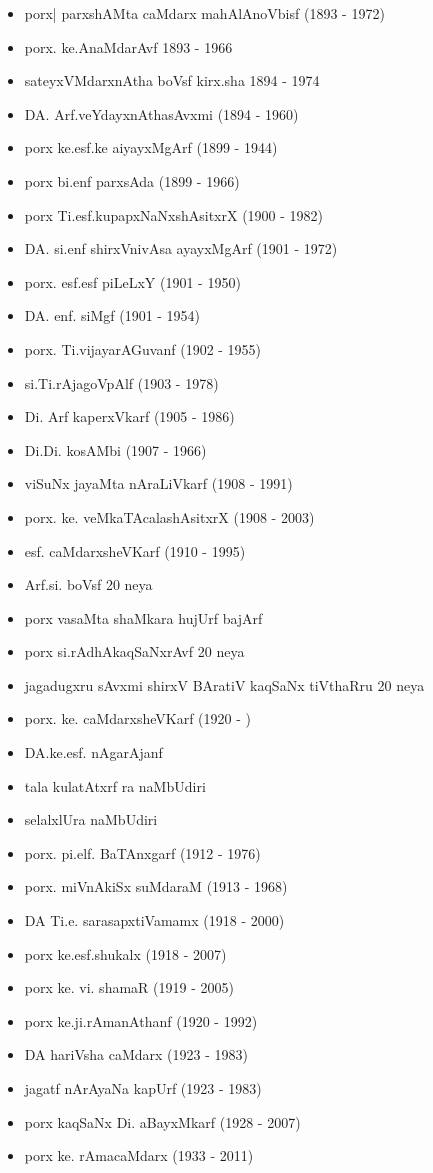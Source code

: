 {\begin{itemize}
\item porx| parxshAMta caMdarx mahAlAnoVbisf {\rm (1893 - 1972)}
\item porx. ke.AnaMdarAvf {\rm 1893 - 1966}
\item sateyxVMdarxnAtha boVsf kirx.sha {\rm 1894 - 1974}
\item DA. Arf.veYdayxnAthasAvxmi {\rm (1894 - 1960)}
\item porx ke.esf.ke aiyayxMgArf {\rm (1899 - 1944)}
\item porx bi.enf parxsAda {\rm (1899 - 1966)}
\item porx Ti.esf.kupapxNaNxshAsitxrX {\rm (1900 - 1982)}
\item DA. si.enf shirxVnivAsa ayayxMgArf {\rm (1901 - 1972)}
\item porx. esf.esf piLeLxY {\rm (1901 - 1950)}
\item DA. enf. siMgf {\rm (1901 - 1954)}
\item porx. Ti.vijayarAGuvanf {\rm (1902 - 1955)}
\item si.Ti.rAjagoVpAlf {\rm (1903 - 1978)}
\item Di. Arf kaperxVkarf {\rm (1905 - 1986)}
\item Di.Di. kosAMbi {\rm (1907 - 1966)}
\item viSuNx jayaMta nAraLiVkarf {\rm (1908 - 1991)}
\item porx. ke. veMkaTAcalashAsitxrX {\rm (1908 - 2003)}
\item esf. caMdarxsheVKarf {\rm (1910 - 1995)}
\item Arf.si. boVsf {\rm 20} neya 
\item porx vasaMta shaMkara hujUrf bajArf
\item porx si.rAdhAkaqSaNxrAvf {\rm 20} neya
\item jagadugxru sAvxmi shirxV BAratiV kaqSaNx tiVthaRru {\rm 20} neya
\item porx. ke. caMdarxsheVKarf {\rm (1920 - )}
\item DA.ke.esf. nAgarAjanf
\item tala kulatAtxrf ra naMbUdiri
\item selalxlUra naMbUdiri
\item porx. pi.elf. BaTAnxgarf {\rm (1912 - 1976)}
\item porx. miVnAkiSx suMdaraM {\rm (1913 - 1968)}
\item DA Ti.e. sarasapxtiVamamx {\rm (1918 - 2000)}
\item porx ke.esf.shukalx {\rm (1918 - 2007)}
\item porx ke. vi.  shamaR {\rm (1919 - 2005)}
\item porx ke.ji.rAmanAthanf {\rm (1920 - 1992)}
\item DA hariVsha caMdarx {\rm (1923 - 1983)}
\item jagatf nArAyaNa kapUrf {\rm (1923 - 1983)}
\item porx kaqSaNx Di. aBayxMkarf {\rm (1928 - 2007)}
\item porx ke. rAmacaMdarx {\rm (1933 - 2011)}
\end{itemize}}

